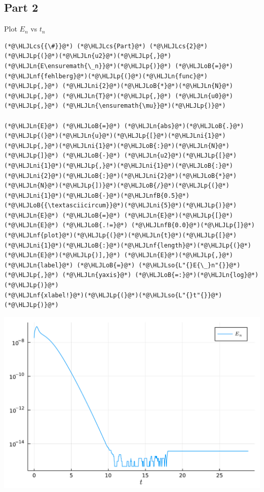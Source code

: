 \documentclass[12pt,a4paper]{article}
\newcommand{\HLJLn}[1]{#1}
\newcommand{\HLJLnf}[1]{\textcolor[RGB]{66,102,213}{#1}}
\newcommand{\HLJLso}[1]{\textcolor[RGB]{201,61,57}{#1}}
\newcommand{\HLJLnfB}[1]{\textcolor[RGB]{59,151,46}{#1}}
\newcommand{\HLJLni}[1]{\textcolor[RGB]{59,151,46}{#1}}
\newcommand{\HLJLoB}[1]{\textcolor[RGB]{102,102,102}{\textbf{#1}}}
\newcommand{\HLJLp}[1]{#1}
\newcommand{\HLJLcs}[1]{\textcolor[RGB]{153,153,119}{\textit{#1}}}
\begin{document}
\subsection{Part 2}
Plot $E_n$ vs $t_n$


\begin{lstlisting}
(*@\HLJLcs{{\#}}@*) (*@\HLJLcs{Part}@*) (*@\HLJLcs{2}@*)
(*@\HLJLp{(}@*)(*@\HLJLn{u2}@*)(*@\HLJLp{,}@*) (*@\HLJLn{E\ensuremath{\_n}}@*)(*@\HLJLp{)}@*) (*@\HLJLoB{=}@*) (*@\HLJLnf{fehlberg}@*)(*@\HLJLp{(}@*)(*@\HLJLn{func}@*)(*@\HLJLp{,}@*) (*@\HLJLni{2}@*)(*@\HLJLoB{*}@*)(*@\HLJLn{N}@*)(*@\HLJLp{,}@*) (*@\HLJLn{T}@*)(*@\HLJLp{,}@*) (*@\HLJLn{u0}@*)(*@\HLJLp{,}@*) (*@\HLJLn{\ensuremath{\mu}}@*)(*@\HLJLp{)}@*)

(*@\HLJLn{E}@*) (*@\HLJLoB{=}@*) (*@\HLJLn{abs}@*)(*@\HLJLoB{.}@*)(*@\HLJLp{(}@*)(*@\HLJLn{u}@*)(*@\HLJLp{[}@*)(*@\HLJLni{1}@*)(*@\HLJLp{,}@*)(*@\HLJLni{1}@*)(*@\HLJLoB{:}@*)(*@\HLJLn{N}@*)(*@\HLJLp{]}@*) (*@\HLJLoB{-}@*) (*@\HLJLn{u2}@*)(*@\HLJLp{[}@*)(*@\HLJLni{1}@*)(*@\HLJLp{,}@*)(*@\HLJLni{1}@*)(*@\HLJLoB{:}@*)(*@\HLJLni{2}@*)(*@\HLJLoB{:}@*)(*@\HLJLni{2}@*)(*@\HLJLoB{*}@*)(*@\HLJLn{N}@*)(*@\HLJLp{])}@*)(*@\HLJLoB{/}@*)(*@\HLJLp{(}@*)(*@\HLJLni{1}@*)(*@\HLJLoB{-}@*)(*@\HLJLnfB{0.5}@*)(*@\HLJLoB{{\textasciicircum}}@*)(*@\HLJLni{5}@*)(*@\HLJLp{)}@*)
(*@\HLJLn{E}@*) (*@\HLJLoB{=}@*) (*@\HLJLn{E}@*)(*@\HLJLp{[}@*)(*@\HLJLn{E}@*) (*@\HLJLoB{.!=}@*) (*@\HLJLnfB{0.0}@*)(*@\HLJLp{]}@*)
(*@\HLJLnf{plot}@*)(*@\HLJLp{(}@*)(*@\HLJLn{t}@*)(*@\HLJLp{[}@*)(*@\HLJLni{1}@*)(*@\HLJLoB{:}@*)(*@\HLJLnf{length}@*)(*@\HLJLp{(}@*)(*@\HLJLn{E}@*)(*@\HLJLp{)],}@*) (*@\HLJLn{E}@*)(*@\HLJLp{,}@*) (*@\HLJLn{label}@*) (*@\HLJLoB{=}@*) (*@\HLJLso{L"{}E{\_}n"{}}@*)(*@\HLJLp{,}@*) (*@\HLJLn{yaxis}@*) (*@\HLJLoB{=:}@*)(*@\HLJLn{log}@*)(*@\HLJLp{)}@*)
(*@\HLJLnf{xlabel!}@*)(*@\HLJLp{(}@*)(*@\HLJLso{L"{}t"{}}@*)(*@\HLJLp{)}@*)
\end{lstlisting}

\includegraphics[width=\linewidth]{figures/ass_2_report_7_1.pdf}
\end{document}
